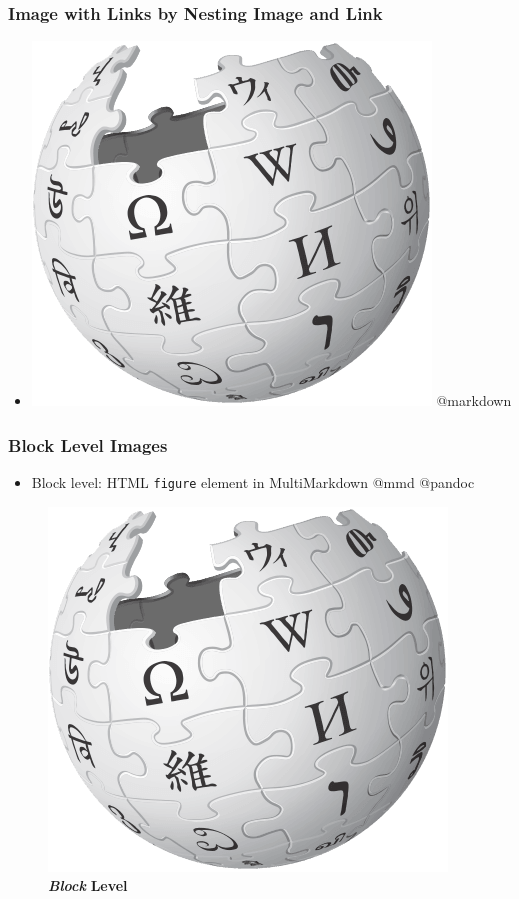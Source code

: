 \documentclass[]{article}
\providecommand{\tightlist}{%
  \setlength{\itemsep}{0pt}\setlength{\parskip}{0pt}}
\begin{document}
\subsubsection{Image with Links by Nesting Image and
Link}\label{image-with-links-by-nesting-image-and-link}

\begin{itemize}
\tightlist
\item
  \href{https://www.wikipedia.org/}{\includegraphics{image.png}}
  @markdown
\end{itemize}

\subsubsection{Block Level Images}\label{block-level-images}

\begin{itemize}
\tightlist
\item
  Block level: HTML \texttt{figure} element in MultiMarkdown @mmd
  @pandoc
\end{itemize}

\begin{figure}[htbp]
\centering
\includegraphics{image.png}
\caption{\textbf{\emph{Block}} \textbf{Level}}
\end{figure}
\end{document}
